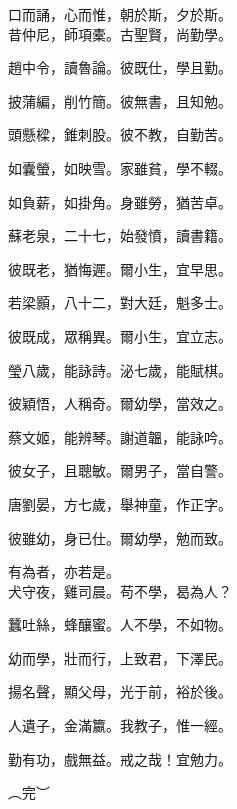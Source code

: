\documentclass[20pt,a4paper,twocolumn]{article}
\begin{document}
\begin{Large}
口而誦，心而惟，朝於斯，夕於斯。
\\

昔仲尼，師項橐。古聖賢，尚勤學。

趙中令，讀魯論。彼既仕，學且勤。

披蒲編，削竹簡。彼無書，且知勉。

頭懸樑，錐刺股。彼不教，自勤苦。

如囊螢，如映雪。家雖貧，學不輟。

如負薪，如掛角。身雖勞，猶苦卓。

蘇老泉，二十七，始發憤，讀書籍。

彼既老，猶悔遲。爾小生，宜早思。

若梁顥，八十二，對大廷，魁多士。

彼既成，眾稱異。爾小生，宜立志。

瑩八歲，能詠詩。泌七歲，能賦棋。

彼穎悟，人稱奇。爾幼學，當效之。

蔡文姬，能辨琴。謝道韞，能詠吟。

彼女子，且聰敏。爾男子，當自警。

唐劉晏，方七歲，舉神童，作正字。

彼雖幼，身已仕。爾幼學，勉而致。

有為者，亦若是。
\\

犬守夜，雞司晨。苟不學，曷為人？

蠶吐絲，蜂釀蜜。人不學，不如物。

幼而學，壯而行，上致君，下澤民。

揚名聲，顯父母，光于前，裕於後。

人遺子，金滿籝。我教子，惟一經。

勤有功，戲無益。戒之哉！宜勉力。

︵完︶

\end{Large}
\end{document}
